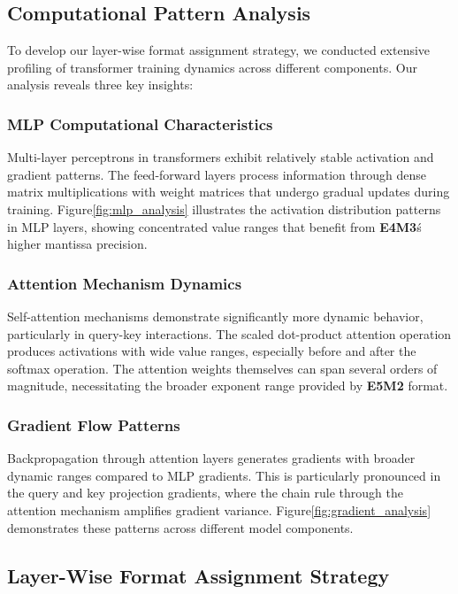 \documentclass[conference]{IEEEtran}
\begin{document}
\subsection{Computational Pattern Analysis}

To develop our layer-wise format assignment strategy, we conducted extensive profiling of transformer training dynamics across different components. Our analysis reveals three key insights:

\subsubsection{MLP Computational Characteristics}
Multi-layer perceptrons in transformers exhibit relatively stable activation and gradient patterns. The feed-forward layers process information through dense matrix multiplications with weight matrices that undergo gradual updates during training. Figure\ref{fig:mlp_analysis} illustrates the activation distribution patterns in MLP layers, showing concentrated value ranges that benefit from \textbf{E4M3}\'s higher mantissa precision.

\subsubsection{Attention Mechanism Dynamics}
Self-attention mechanisms demonstrate significantly more dynamic behavior, particularly in query-key interactions. The scaled dot-product attention operation produces activations with wide value ranges, especially before and after the softmax operation. The attention weights themselves can span several orders of magnitude, necessitating the broader exponent range provided by \textbf{E5M2} format.

\subsubsection{Gradient Flow Patterns}
Backpropagation through attention layers generates gradients with broader dynamic ranges compared to MLP gradients. This is particularly pronounced in the query and key projection gradients, where the chain rule through the attention mechanism amplifies gradient variance. Figure\ref{fig:gradient_analysis} demonstrates these patterns across different model components.

\subsection{Layer-Wise Format Assignment Strategy}
\end{document}

